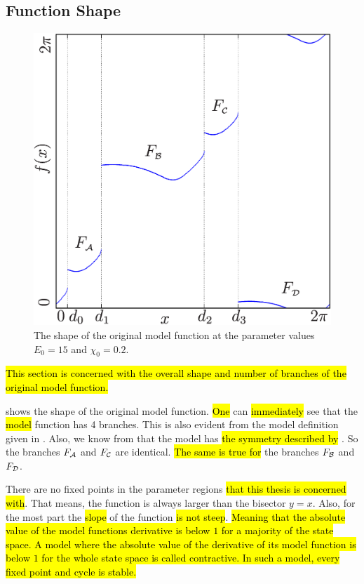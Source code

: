 \subsection{Function Shape}

\begin{figure}
	\centering
	\includegraphics[width=.5 \textwidth]{../Figures/5/5.1/illustration.png}
	\caption[Shape of the original model function]{
		The shape of the original model function at the parameter values $E_0 = 15$ and $\chi_0 = 0.2$.
	}
	\label{fig:setup.char.shape}
\end{figure}

\hl{
	This section is concerned with the overall shape and number of branches of the original model function.
}

 shows the shape of the original model function.
\hl{One} can \hl{immediately} see that the \hl{model} function has 4 branches.
This is also evident from the model definition given in .
Also, we know from  that the model has \hl{the symmetry described by} .
So the branches $F_{\mathcal{A}}$ and $F_{\mathcal{C}}$ are identical.
\hl{The same is true for} the branches $F_{\mathcal{B}}$ and $F_{\mathcal{D}}$.

There are no fixed points in the parameter regions \hl{that this thesis is concerned with}.
That means, the function is always larger than the bisector $y=x$.
Also, for the most part the \hl{slope} of the function \hl{is not steep}.
\hl{
	Meaning that the absolute value of the model functions derivative is below $1$ for a majority of the state space.
	A model where the absolute value of the derivative of its model function is below $1$ for the whole state space is called contractive.
	In such a model, every fixed point and cycle is stable.
}
